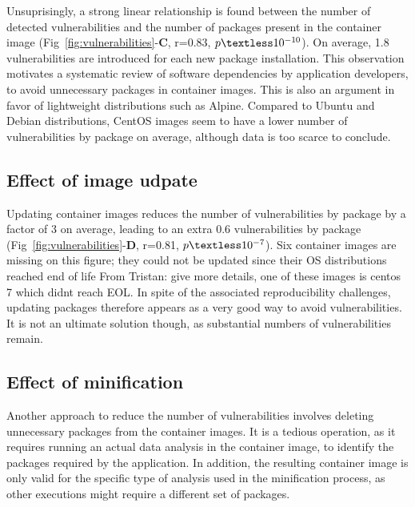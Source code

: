 \documentclass[a4paper,num-refs]{oup-contemporary}
\newcommand{\tristan}[1]{\color{blue}From Tristan: #1\color{black}}
\begin{document}
Unsuprisingly, a strong linear relationship is found between the number of
detected vulnerabilities and the number of packages present in the
container image (Fig~\ref{fig:vulnerabilities}-\textbf{C}, r=0.83,
$p\textless10^{-10}$). On average, 1.8 vulnerabilities are introduced for
each new package installation. This observation motivates a systematic
review of software dependencies by application developers, to avoid
unnecessary packages in container images. This is also an argument in favor of lightweight
distributions such as Alpine. Compared to Ubuntu and Debian distributions,
CentOS images seem to have a lower number of vulnerabilities by package on
average, although data is too scarce to conclude.

\subsection{Effect of image udpate}

Updating container images reduces the number of vulnerabilities by package
by a factor of 3 on average, leading to an extra 0.6 vulnerabilities by
package (Fig~\ref{fig:vulnerabilities}-\textbf{D}, r=0.81,
$p\textless10^{-7}$). Six container images are missing on this figure; they
could not be updated since their OS distributions reached end of life
\tristan{give more details, one of these images is centos 7 which didnt
reach EOL}. In spite of the associated reproducibility challenges, updating
packages therefore appears as a very good way to avoid vulnerabilities. It
is not an ultimate solution though, as substantial numbers of
vulnerabilities remain.

\subsection{Effect of minification}

Another approach to reduce the number of vulnerabilities involves deleting
unnecessary packages from the container images. It is a tedious operation,
as it requires running an actual data analysis in the container image, to
identify the packages required by the application. In addition, the
resulting container image is only valid for the specific type of analysis
used in the minification process, as other executions might require a
different set of packages. 
\end{document}
